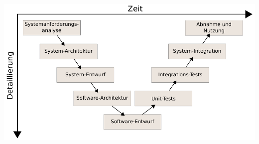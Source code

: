 \begin{itemize}
		\begin{minipage}{\linewidth}
			\includegraphics[scale=0.8]{swt2/V-Modell.pdf}
		\end{minipage}
\end{itemize}